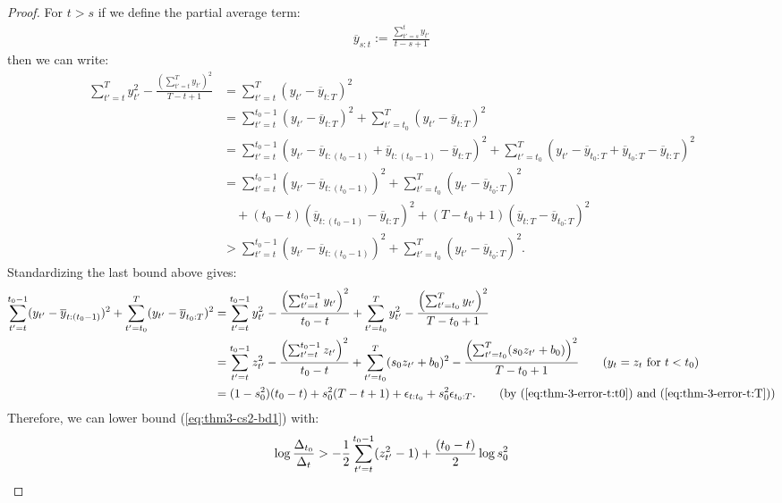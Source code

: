\begin{proof}
For $t > s$ if we define the partial average term:
\begin{align*}
    \overline{y}_{s:t} := \frac{\sum_{t'=s}^t y_{t'}}{t-s+1} 
\end{align*}
then we can write:
\small
\begin{align*}
    \sum_{t'=t}^T y_{t'}^2 - \frac{\left(\sum_{t'=t}^T y_{t'}\right)^2}{T-t+1} &= \sum_{t'=t}^T (y_{t'} - \overline{y}_{t:T})^2 \\
    &= \sum_{t'=t}^{t_0-1 } (y_{t'} - \overline{y}_{t:T})^2 + \sum_{t'=t_0}^T (y_{t'} - \overline{y}_{t:T})^2 \\
    &= \sum_{t'=t}^{t_0-1 } (y_{t'} - \overline{y}_{t:(t_0-1)} + \overline{y}_{t:(t_0-1)} - \overline{y}_{t:T})^2 + \sum_{t'=t_0}^T (y_{t'} - \overline{y}_{t_0:T} + \overline{y}_{t_0:T} - \overline{y}_{t:T})^2 \\
    &= \sum_{t'=t}^{t_0-1 } (y_{t'} - \overline{y}_{t:(t_0-1)})^2 + \sum_{t'=t_0}^T (y_{t'} - \overline{y}_{t_0:T})^2 \\
    &\quad + (t_0-t)(\overline{y}_{t:(t_0-1)} - \overline{y}_{t:T})^2  +  (T-t_0+1)(\overline{y}_{t:T} - \overline{y}_{t_0:T})^2 \\
    &> \sum_{t'=t}^{t_0-1 } (y_{t'} - \overline{y}_{t:(t_0-1)})^2 + \sum_{t'=t_0}^T (y_{t'} - \overline{y}_{t_0:T})^2.
\end{align*}
\normalsize
Standardizing the last bound above gives:
\small
\begin{align*}
    \sum_{t'=t}^{t_0-1 } (y_{t'} - \overline{y}_{t:(t_0-1)})^2 + \sum_{t'=t_0}^T (y_{t'} - \overline{y}_{t_0:T})^2 &= \sum_{t'=t}^{t_0-1 } y^2_{t'} - \frac{\left(\sum_{t'=t}^{t_0-1 } y_{t'}\right)^2}{t_0-t} + \sum_{t'=t_0}^{T} y^2_{t'} - \frac{\left(\sum_{t'=t_0}^{T} y_{t'}\right)^2}{T-t_0+1} \\
    &= \sum_{t'=t}^{t_0-1 } z^2_{t'} - \frac{\left(\sum_{t'=t}^{t_0-1 } z_{t'}\right)^2}{t_0-t} + \sum_{t'=t_0}^{T} (s_0 z_{t'} + b_0)^2  - \frac{\left(\sum_{t'=t_0}^{T} (s_0 z_{t'} + b_0)\right)^2}{T-t_0+1} \tag{$y_t = z_t$ for $t < t_0$} \\
    &= (1 - s_0^2)(t_0 - t) + s_0^2(T-t +1) + \epsilon_{t:t_0}+ s^2_0\epsilon_{t_0:T}. \tag{by (\ref{eq:thm-3-error-t:t0}) and (\ref{eq:thm-3-error-t:T})}
\end{align*}
\normalsize
Therefore, we can lower bound (\ref{eq:thm3-cs2-bd1}) with:
\begin{align}
    \log \frac{\Delta_{t_0}}{\Delta_t} &> - \frac{1}{2} \sum_{t' = t}^{t_0 - 1} (z_{t'}^2-1) + \frac{(t_0-t)}{2}\log s_0^2 \notag \\

\end{align}
\end{proof}
